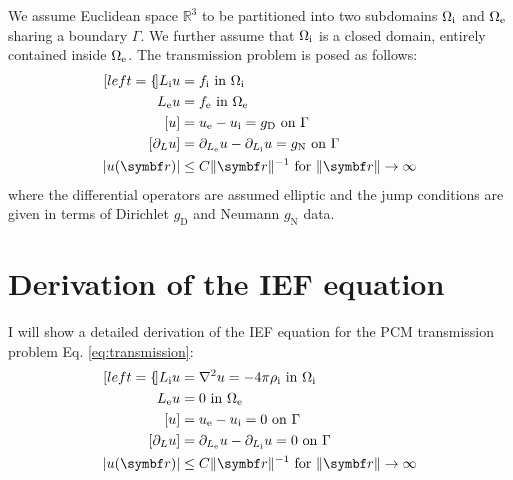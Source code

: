 \begin{defin}
We assume Euclidean space $\mathbb{R}^3$ to be partitioned into two subdomains
$\Omega_\mathrm{i}$ and $\Omega_\mathrm{e}$ sharing a boundary $\Gamma$. We further assume that
$\Omega_\mathrm{i}$ is a closed domain, entirely contained inside $\Omega_\mathrm{e}$.
The transmission problem is posed as follows:
\begin{subequations}\label{eq:transmission-general}
\begin{align}[left={\empheqlbrace}]
  \Li u &= f_\mathrm{i} \,\, \text{in}\,\, \Omegai \\
  \Le u &= f_\mathrm{e} \,\, \text{in}\,\, \Omegae \\
  [u] &= \ue - \ui = g_\mathrm{D} \,\, \text{on}\,\, \Gamma
   \\
[\partial_L u] &= \partiale u - \partiali u = g_\mathrm{N} \,\,
\text{on}\,\, \Gamma \\
|u(\vect{r})| &\leq C \|\vect{r} \|^{-1} \,\,\text{for}\,\,\| \vect{r} \|\rightarrow\infty
\end{align}
\end{subequations}
where the differential operators are assumed elliptic and the jump conditions are
given in terms of Dirichlet $g_\mathrm{D}$ and Neumann $g_\mathrm{N}$ data.
\end{defin}

\section{Derivation of the IEF equation}
I will show a detailed derivation of the \acrshort{IEF} equation
for the \acrshort{PCM} transmission problem Eq. \eqref{eq:transmission}:
\begin{subequations}
  \begin{align}[left={\empheqlbrace}]
  \Li u &= \nabla^2 u = -4\pi\rhoi \,\, \text{in}\,\, \Omegai \\
  \Le u &= 0 \,\, \text{in}\,\, \Omegae \\
  [u] &= \ue - \ui = 0 \,\, \text{on}\,\, \Gamma \\
[\partial_L u] &= \partiale u - \partiali u = 0 \,\, \text{on}\,\, \Gamma \\
|u(\vect{r})| &\leq C \|\vect{r} \|^{-1} \,\,\text{for}\,\,\| \vect{r} \|\rightarrow\infty
\end{align}
\end{subequations}

